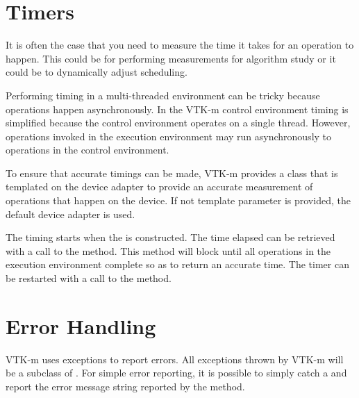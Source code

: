 
\section{Timers}
\label{sec:Timers}


It is often the case that you need to measure the time it takes for an
operation to happen. This could be for performing measurements for
algorithm study or it could be to dynamically adjust scheduling.

Performing timing in a multi-threaded environment can be tricky because
operations happen asynchronously. In the VTK-m control environment timing
is simplified because the control environment operates on a single
thread. However, operations invoked in the execution environment may run
asynchronously to operations in the control environment.

To ensure that accurate timings can be made, VTK-m provides a
 class that is templated on the device adapter to provide
an accurate measurement of operations that happen on the device. If not
template parameter is provided, the default device adapter is used.

The timing starts when the  is constructed. The time
elapsed can be retrieved with a call to the 
method. This method will block until all operations in the execution
environment complete so as to return an accurate time. The timer can be
restarted with a call to the  method.




\section{Error Handling}
\label{sec:ErrorHandlingControl}


VTK-m uses exceptions to report errors. All exceptions thrown by VTK-m will
be a subclass of . For simple error reporting, it is
possible to simply catch a  and report the error message
string reported by the  method.

